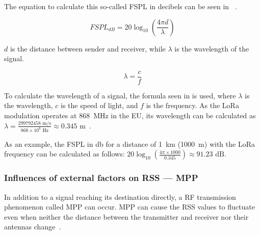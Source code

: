 The equation to calculate this so-called \acl{FSPL} in decibels can be seen in ~\cite[p. 1321]{whitaker_electronics_1996}.

\begin{equation}\label{eq:fspl}
    FSPL_{dB} = 20 \log_{10}\left(\frac{4 \pi d}{\lambda}\right)
\end{equation}

$d$ is the distance between sender and receiver, while $\lambda$ is the wavelength of the signal.

\begin{equation}\label{eq:wavelength-of-a-signal}
    \lambda = \frac{c}{f}
\end{equation}

To calculate the wavelength of a signal, the formula seen in  is used, where $\lambda$ is the wavelength, $c$ is the speed of light, and $f$ is the frequency.
As the \ac{LoRa} modulation operates at \SI{868}{\mega\hertz} in the \ac{EU}, its wavelength can be calculated as $\lambda = \frac{299792458 \text{ m/s}}{868 \times 10^6 \text{ Hz}} \approx 0.345 \text{ m}$~\cite{lora_alliance_inc_lorawan_regional_2017}.

As an example, the \acl{FSPL} in \si{\decibel} for a distance of \SI{1}{\kilo\metre} (\SI{1000}{\metre}) with the \ac{LoRa} frequency can be calculated as follows: $20 \log_{10}\left(\frac{4 \pi \times 1000}{0.345}\right) \approx 91.23 \text{ dB}$.

\subsubsection{Influences of external factors on \acs{RSS} — \acl{MPP}}\label{sec:multipath-propagation}

In addition to a signal reaching its destination directly, a \ac{RF} transmission phenomenon called \acf{MPP} can occur.
\acl{MPP} can cause the \ac{RSS} values to fluctuate even when neither the distance between the transmitter and receiver nor their antennas change~\cite[p. 136]{abdelfadeel_how_2019}.

